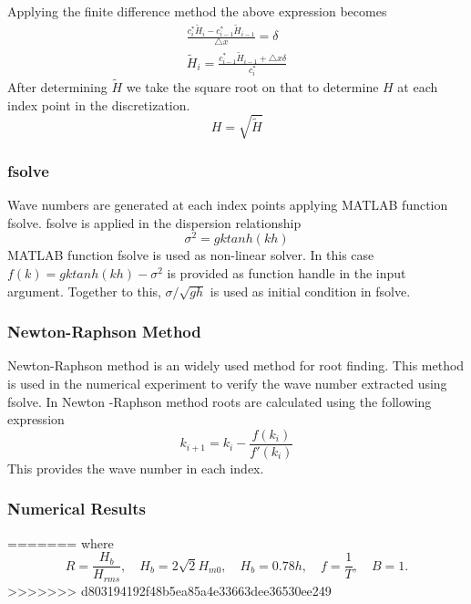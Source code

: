 Applying the finite difference method the above expression becomes
\begin{eqnarray*}
\frac{c_{i}^{*}\tilde{H}_{i}-c_{i-1}^{*}\tilde{H}_{i-1}}{\triangle x}= \delta
\\ \tilde{H}_{i}=\frac{c_{i-1}^{*}\tilde{H}_{i-1}+\triangle x \delta}{c_{i}^{*}}
\end{eqnarray*}
After determining ${\tilde{H}}$ we take the square root on that to determine ${H}$ at each index point in the discretization.
\begin{equation*}
H=\sqrt{\tilde{H}}
\end{equation*}
\subsubsection*{fsolve}
Wave numbers are generated at each index points applying MATLAB function fsolve. fsolve is applied in the  dispersion relationship
\begin{equation*}
\sigma^{2}=gk tanh(kh)
\end{equation*} 
MATLAB function fsolve is used as non-linear solver. In this case ${f(k)=gk tanh(kh)-\sigma^{2}}$ is provided as function handle in the input argument. Together to this,     ${\sigma/\sqrt{gh}}$ is used as initial condition in fsolve.
\subsubsection*{Newton-Raphson Method}
Newton-Raphson method is an widely used method for root finding. This method is used in the numerical experiment to verify the wave number extracted using fsolve. In Newton -Raphson method roots are calculated using the following expression
\begin{equation*}
k_{i+1}=k_{i}-\frac{f(k_{i})}{f'(k_{i})}
\end{equation*}
This provides the wave number in each index.
\subsubsection{Numerical Results}
=======
where $$R=\frac{H_b}{H_{rms}}, \quad H_b = 2\sqrt{2}H_{m0},\quad H_b=0.78h,\quad f=\frac{1}{T},\quad B=1.$$
>>>>>>> d803194192f48b5ea85a4e33663dee36530ee249
